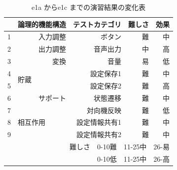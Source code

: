 \begin{table}[htbp]
  \centering
  \caption{e1a からe1c までの演習結果の変化表}
    \begin{tabular}{rrrrr}
    \hline
    \multicolumn{1}{|l|}{} & \multicolumn{1}{p{7em}|}{\textbf{論理的機能構造}} & \multicolumn{1}{p{7em}|}{\textbf{テストカテゴリ}} & \multicolumn{1}{p{4.5em}|}{\textbf{難しさ}} & \multicolumn{1}{p{4.5em}|}{\textbf{効果}} \bigstrut\\
    \hline
    \multicolumn{1}{|l|}{1} & \multicolumn{1}{p{6em}|}{入力調整} & \multicolumn{1}{p{6em}|}{ボタン} & \multicolumn{1}{p{6em}|}{難} & \multicolumn{1}{p{6em}|}{中} \bigstrut\\
    \hline
    \multicolumn{1}{|l|}{2} & \multicolumn{1}{p{6em}|}{出力調整} & \multicolumn{1}{p{6em}|}{音声出力} & \multicolumn{1}{p{6em}|}{中} & \multicolumn{1}{p{6em}|}{高} \bigstrut\\
    \hline
    \multicolumn{1}{|l|}{3} & \multicolumn{1}{p{6em}|}{変換} & \multicolumn{1}{p{6em}|}{音量} & \multicolumn{1}{p{6em}|}{易} & \multicolumn{1}{p{6em}|}{低} \bigstrut\\
    \hline
    \multicolumn{1}{|l|}{4} & \multicolumn{1}{l|}{\multirow{2}[4]{*}{貯蔵}} & \multicolumn{1}{p{6em}|}{設定保存1} & \multicolumn{1}{p{6em}|}{難} & \multicolumn{1}{p{6em}|}{中} \bigstrut\\
\cline{1-1}\cline{3-5}    \multicolumn{1}{|l|}{5} & \multicolumn{1}{l|}{} & \multicolumn{1}{p{6em}|}{設定保存2} & \multicolumn{1}{p{6em}|}{難} & \multicolumn{1}{p{6em}|}{高} \bigstrut\\
    \hline
    \multicolumn{1}{|l|}{6} & \multicolumn{1}{p{6em}|}{サポート} & \multicolumn{1}{p{6em}|}{状態遷移} & \multicolumn{1}{p{6em}|}{難} & \multicolumn{1}{p{6em}|}{中} \bigstrut\\
    \hline
    \multicolumn{1}{|r|}{7} & \multicolumn{1}{l|}{\multirow{3}[6]{*}{相互作用}} & \multicolumn{1}{p{6em}|}{対向機反映} & \multicolumn{1}{p{6em}|}{難} & \multicolumn{1}{p{6em}|}{低} \bigstrut\\
\cline{1-1}\cline{3-5}    \multicolumn{1}{|r|}{8} & \multicolumn{1}{l|}{} & \multicolumn{1}{p{6em}|}{設定情報共有1} & \multicolumn{1}{p{6em}|}{難} & \multicolumn{1}{p{6em}|}{中} \bigstrut\\
\cline{1-1}\cline{3-5}    \multicolumn{1}{|r|}{9} & \multicolumn{1}{l|}{} & \multicolumn{1}{p{6em}|}{設定情報共有2} & \multicolumn{1}{p{6em}|}{難} & \multicolumn{1}{p{6em}|}{中} \bigstrut\\
    \hline
    \multicolumn{5}{p{30em}}{難しさ　0-10難　11-25中　26-易} \bigstrut[t]\\
    \multicolumn{5}{p{30em}}{0-10低　11-25中　26-高} \bigstrut[t] \\
    \end{tabular}%
  \label{tbl:D-3-tbl10}%
\end{table}%

